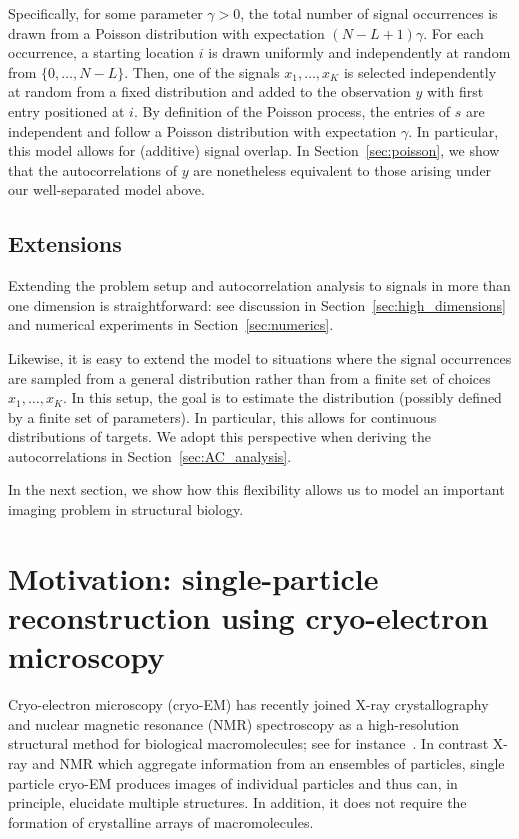 \documentclass[12pt]{article}
\newcommand{\1}{\mathbf{1}}
\newcommand{\TODO}[1]{{\color{red}{[#1]}}}
\theoremstyle{plain}
\theoremstyle{definition}
\theoremstyle{remark}
\theoremstyle{plain}
\theoremstyle{remark}
\theoremstyle{plain}
\theoremstyle{plain}
\theoremstyle{plain}
\numberwithin{equation}{section}
\begin{document}
\TODO{Careful that $\gamma$ changed by a factor of $L$: need to modify here too.} Specifically, for some parameter $\gamma > 0$, the total number of signal occurrences is drawn from a Poisson distribution with expectation $(N-L+1)\gamma$. For each occurrence, a starting location $i$ is drawn uniformly and independently at random from $\{0, \ldots, N-L\}$. Then, one of the signals $x_1, \ldots, x_K$ is selected independently at random from a fixed distribution and added to the observation $y$ with first entry positioned at $i$. 
By definition of the Poisson process, the entries of $s$ are independent and follow a Poisson distribution with expectation $\gamma$. In particular, this model allows for (additive) signal overlap. In Section~\ref{sec:poisson}, we show that the autocorrelations of $y$ are nonetheless equivalent to those arising under our well-separated model above.
 
\subsection*{Extensions} \label{sec:extensions}

Extending the problem setup and autocorrelation analysis to signals in more than one dimension is straightforward: see discussion in Section~\ref{sec:high_dimensions} and numerical experiments in Section~\ref{sec:numerics}.

Likewise, it is easy to extend the model to situations where the signal occurrences are sampled from a general distribution rather than from a finite set of choices $x_1, \ldots, x_K$. In this setup, the goal is to estimate the distribution (possibly defined by a finite set of parameters). In particular, this allows for continuous distributions of targets. We adopt this perspective when deriving the autocorrelations in Section~\ref{sec:AC_analysis}.

In the next section, we show how this flexibility allows us to model an important imaging problem in structural biology.



\section{Motivation: single-particle reconstruction using cryo-electron microscopy}
Cryo-electron microscopy (cryo-EM)  has recently joined X-ray crystallography and nuclear magnetic resonance (NMR) spectroscopy as a high-resolution structural method for biological macromolecules; see for instance~\cite{frank2006three,kuhlbrandt2014resolution,bartesaghi20152}. 
In contrast X-ray and NMR which aggregate information from an ensembles of
particles, single particle cryo-EM produces images of individual particles and thus can, in principle, elucidate multiple  structures.
In addition, it does not require the formation of crystalline arrays of macromolecules.
\end{document}
